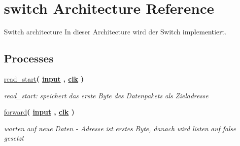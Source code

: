 \hypertarget{classswitch_1_1switch}{}\section{switch Architecture Reference}
\label{classswitch_1_1switch}


Switch architecture In dieser Architecture wird der Switch implementiert.  


\subsection*{Processes}
 \begin{DoxyCompactItemize}
\item 
\mbox{\label{classswitch_1_1switch_a819d62f4f1dd96137802a2fdd9bfb72e}} 
\mbox{\hyperlink{classswitch_1_1switch_a819d62f4f1dd96137802a2fdd9bfb72e}{read\+\_\+start}}{\bfseries  ( {\bfseries {\bfseries \mbox{\hyperlink{classswitch_a2b3987f98197ec2f7358c2e5e91f234e}{input}}} \textcolor{vhdlchar}{ }} , {\bfseries {\bfseries \mbox{\hyperlink{classswitch_a4a4609c199d30b3adebbeb3a01276ec5}{clk}}} \textcolor{vhdlchar}{ }} )}
\begin{DoxyCompactList}\small\item\em read\+\_\+start\+: speichert das erste Byte des Datenpakets als Zieladresse \end{DoxyCompactList}\item 
\mbox{\label{classswitch_1_1switch_aeb3ad6373550eeb671e35a9223c001a6}} 
\mbox{\hyperlink{classswitch_1_1switch_aeb3ad6373550eeb671e35a9223c001a6}{forward}}{\bfseries  ( {\bfseries {\bfseries \mbox{\hyperlink{classswitch_a2b3987f98197ec2f7358c2e5e91f234e}{input}}} \textcolor{vhdlchar}{ }} , {\bfseries {\bfseries \mbox{\hyperlink{classswitch_a4a4609c199d30b3adebbeb3a01276ec5}{clk}}} \textcolor{vhdlchar}{ }} )}
\begin{DoxyCompactList}\small\item\em warten auf neue Daten -\/ Adresse ist erstes Byte, danach wird listen auf false gesetzt \end{DoxyCompactList}\end{DoxyCompactItemize}
